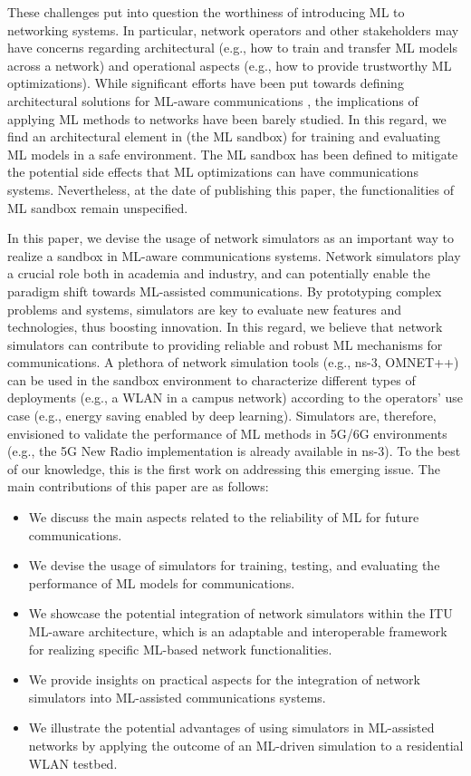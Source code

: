 \documentclass[journal]{IEEEtran}
\begin{document}
	These challenges put into question the worthiness of introducing ML to networking systems. In particular, network operators and other stakeholders may have concerns regarding architectural (e.g., how to train and transfer ML models across a network) and operational aspects (e.g., how to provide trustworthy ML optimizations). While significant efforts have been put towards defining architectural solutions for ML-aware communications \cite{3gpp2019study, ETSI, ITU3172, ITU3174}, the implications of applying ML methods to networks have been barely studied. In this regard, we find an architectural element in \cite{ITU3172} (the ML sandbox) for training and evaluating ML models in a safe environment. The ML sandbox has been defined to mitigate the potential side effects that ML optimizations can have communications systems. Nevertheless, at the date of publishing this paper, the functionalities of ML sandbox remain unspecified.
	
	In this paper, we devise the usage of network simulators as an important way to realize a sandbox in ML-aware communications systems. Network simulators play a crucial role both in academia and industry, and can potentially enable the paradigm shift towards ML-assisted communications. By prototyping complex problems and systems, simulators are key to evaluate new features and technologies, thus boosting innovation. In this regard, we believe that network simulators can contribute to providing reliable and robust ML mechanisms for communications. A plethora of network simulation tools (e.g., ns-3, OMNET++) can be used in the sandbox environment to characterize different types of deployments (e.g., a WLAN in a campus network) according to the operators' use case (e.g., energy saving enabled by deep learning). Simulators are, therefore, envisioned to validate the performance of ML methods in 5G/6G environments (e.g., the 5G New Radio implementation is already available in ns-3). To the best of our knowledge, this is the first work on addressing this emerging issue. The main contributions of this paper are as follows:
	\begin{itemize}
		\item We discuss the main aspects related to the reliability of ML for future communications.
		\item We devise the usage of simulators for training, testing, and evaluating the performance of ML models for communications.
		\item We showcase the potential integration of network simulators within the ITU ML-aware architecture, which is an adaptable and interoperable framework for realizing specific ML-based network functionalities.
		\item We provide insights on practical aspects for the integration of network simulators into ML-assisted communications systems. 
		\item We illustrate the potential advantages of using simulators in ML-assisted networks by applying the outcome of an ML-driven simulation to a residential WLAN testbed.
	\end{itemize}
	
\end{document}
